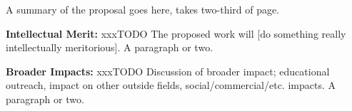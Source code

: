 
A summary of the proposal goes here, takes two-third of page.

\vspace{1ex}
\noindent
{\bf Intellectual Merit:} xxxTODO The proposed work will [do something really intellectually meritorious].  A paragraph or two.

\vspace{1ex}
\noindent
{\bf Broader Impacts:} xxxTODO Discussion of broader impact; educational outreach, impact on other outside fields, social/commercial/etc. impacts.  A paragraph or two.